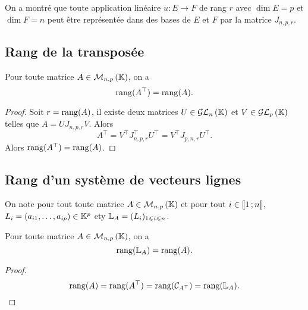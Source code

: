  On a montré que toute application linéaire $u: E \rightarrow F$ de rang $r$ avec $\dim E=p$ et $\dim F=n$ peut être représentée dans des bases de $E$ et $F$ par la matrice $J_{n,p,r}$.

\subsection{Rang de la transposée}

\begin{theo}
  Pour toute matrice $A \in \mathcal{M}_{n,p}\left(\mathbb{K}\right)$, on a
  \begin{equation}
    \operatorname{rang}(A^\top)=\operatorname{rang}(A).
  \end{equation}
\end{theo}
\begin{proof}
  Soit $r=\operatorname{rang}(A)$, il existe deux matrices $U \in \mathcal{GL}_{n}\left(\mathbb{K}\right)$ et $V \in \mathcal{GL}_{p}\left(\mathbb{K}\right)$ telles que $A=U J_{n,p,r} V$. Alors 
  \begin{equation}
    A^\top = V^\top J_{n,p,r}^\top U^\top = V^\top J_{p,n,r} U^\top.
  \end{equation}
  Alors $\operatorname{rang}(A^\top)=\operatorname{rang}(A)$.
\end{proof}

\subsection{Rang d'un système de vecteurs lignes}

On note pour tout toute matrice $A \in \mathcal{M}_{n,p}\left(\mathbb{K}\right)$ et pour tout $i \in \mathopen{\llbracket}1\mathclose{}\mathpunct{};n\mathclose{\rrbracket}$, $L_i=(a_{i1}, \ldots, a_{ip}) \in \mathbb{K}^p$ ety $\mathbb{L}_A=(L_i)_{1\leqslant i \leqslant n}$.
\begin{prop}
  Pour toute matrice $A \in \mathcal{M}_{n,p}\left(\mathbb{K}\right)$, on a
  \begin{equation}
    \operatorname{rang}(\mathbb{L}_A)=\operatorname{rang}(A).
  \end{equation}
\end{prop}
\begin{proof}
  \begin{equation}
    \operatorname{rang}(A)=\operatorname{rang}(A^\top)=\operatorname{rang}(\mathcal{C}_{A^\top})=\operatorname{rang}(\mathbb{L}_A).
  \end{equation}
\end{proof}
